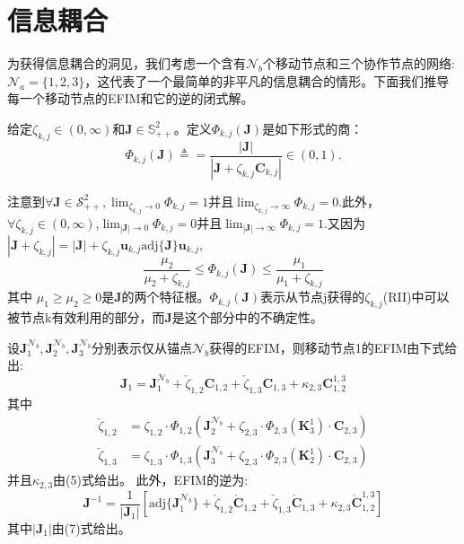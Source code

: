 \section{信息耦合}
为获得信息耦合的洞见，我们考虑一个含有$\mathcal{N}_b$个移动节点和三个协作节点的网络:$\mathcal{N}_a=\{1,2,3\}$，这代表了一个最简单的非平凡的信息耦合的情形。下面我们推导每一个移动节点的EFIM和它的逆的闭式解。
\begin{definition}
给定$\zeta_{k,j} \in (0,\infty)$和$\bm{J} \in \mathbb{S}^2_{++}$。定义$\Phi_{k,j}(\bm{J})$是如下形式的商：
\[
\Phi_{k,j}(\bm{J})\triangleq=\frac{|\bm{J}|}{|\bm{J}+\zeta_{k,j}\bm{C}_{k,j}|}\in (0,1).
\]
\end{definition}
\begin{remark}
注意到$\forall \bm{J} \in \mathcal{S}^2_{++},\lim_{\zeta_{k,j} \rightarrow 0}\Phi_{k,j}=1$并且$\lim_{\zeta_{k,j} \rightarrow \infty}\Phi_{k,j}=0$.此外，$\forall \zeta_{k,j} \in (0,\infty)$,$\lim_{|\bm{J}|\rightarrow 0}\Phi_{k,j}=0$并且$\lim_{|\bm{J}|\rightarrow \infty}\Phi_{k,j}=1.$又因为$|\bm{J}+\zeta_{k,j}|=|\bm{J}|+\zeta_{k,j}\bm{u}_{k,j}\text{adj}\{\bm{J}\}\bm{u}_{k,j},$
\[
\frac{\mu_2}{\mu_2+\zeta_{k,j}}\leq \Phi_{k,j}(\bm{J})\leq \frac{\mu_1}{\mu_1+\zeta_{k,j}}
\]
其中 $\mu_1 \geq \mu_2 \ge 0$是$\bm{J}$的两个特征根。$\Phi_{k,j}(\bm{J})$表示从节点j获得的$\zeta_{k,j}$(RII)中可以被节点k有效利用的部分，而$\bm{J}$是这个部分中的不确定性。
\end{remark}
\begin{theorem}
设$\bm{J}_1^{\mathcal{N}_b},\bm{J}_2^{\mathcal{N}_b},\bm{J}_3^{\mathcal{N}_b}$分别表示仅从锚点$\mathcal{N}_b$获得的EFIM，则移动节点1的EFIM由下式给出:
\begin{equation}
\bm{J}_1=\bm{J}_1^{\mathcal{N}_b}+\check{\zeta}_{1,2}\bm{C}_{1,2}+\check{\zeta}_{1,3}\bm{C}_{1,3}+\kappa_{2,3}\bm{C}^{1,3}_{1,2}
\end{equation}
其中
\begin{eqnarray}
\check{\zeta}_{1,2}&=\zeta_{1,2} \cdot \Phi_{1,2}(\bm{J}_2^{\mathcal{N}_b}+\zeta_{2,3} \cdot \Phi_{2,3}(\bm{K}_3^{1})\cdot \bm{C}_{2,3})\\
\check{\zeta}_{1,3}&=\zeta_{1,3} \cdot \Phi_{1,3}(\bm{J}_3^{\mathcal{N}_b}+\zeta_{2,3} \cdot \Phi_{2,3}(\bm{K}_2^{1})\cdot \bm{C}_{2,3})
\end{eqnarray}
并且$\kappa_{2,3}$由(5)式给出。
此外，EFIM的逆为:
\begin{equation}
\bm{J}^{-1}=\frac{1}{|\bm{J}_1|}[\text{adj}\{\bm{J}^{\mathcal{N}_b}_1\}+\check{\zeta}_{1,2}\mathring{\bm{C}}_{1,2}+\check{\zeta}_{1,3}\mathring{\bm{C}}_{1,3}+\kappa_{2,3}\mathring{\bm{C}}_{1,2}^{1,3}]
\end{equation}
其中$|\bm{J}_1|$由(7)式给出。
\end{theorem}

